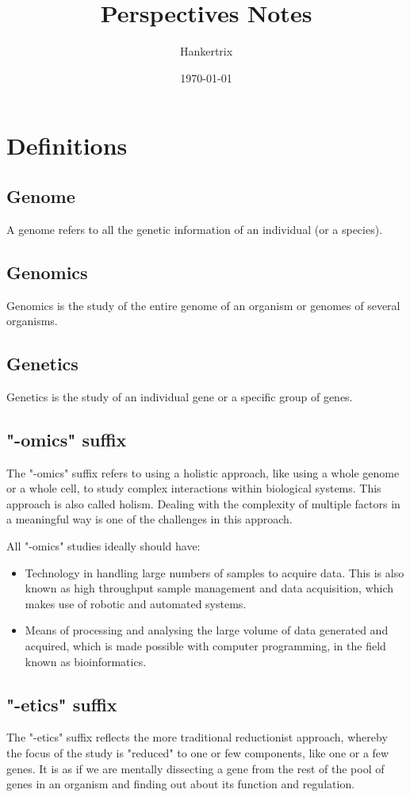 \documentclass[11pt]{article}
\author{Hankertrix}
\date{\today}
\title{Perspectives Notes}
\begin{document}
\maketitle
\setcounter{tocdepth}{2}
\tableofcontents \clearpage\newpage
\section{Definitions}
\label{sec:orgd32f78e}

\subsection{Genome}
\label{sec:org2e7056d}
A genome refers to all the genetic information of an individual (or a species).
\subsection{Genomics}
\label{sec:org71b6a28}
Genomics is the study of the entire genome of an organism or genomes of several organisms.
\subsection{Genetics}
\label{sec:org235ce20}
Genetics is the study of an individual gene or a specific group of genes.
\subsection{"-omics" suffix}
\label{sec:org39f85aa}
The "-omics" suffix refers to using a holistic approach, like using a whole genome or a whole cell, to study complex interactions within biological systems. This approach is also called holism. Dealing with the complexity of multiple factors in a meaningful way is one of the challenges in this approach.


All "-omics" studies ideally should have:
\begin{itemize}
\item Technology in handling large numbers of samples to acquire data. This is also known as high throughput sample management and data acquisition, which makes use of robotic and automated systems.
\item Means of processing and analysing the large volume of data generated and acquired, which is made possible with computer programming, in the field known as bioinformatics.
\end{itemize}

\newpage
\subsection{"-etics" suffix}
\label{sec:orgc410fc0}
The "-etics" suffix reflects the more traditional reductionist approach, whereby the focus of the study is "reduced" to one or few components, like one or a few genes. It is as if we are mentally dissecting a gene from the rest of the pool of genes in an organism and finding out about its function and regulation.
\end{document}
